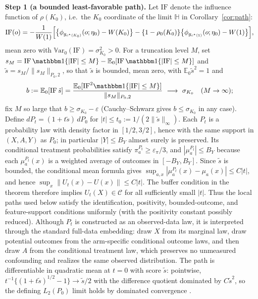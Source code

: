 \documentclass[11pt]{article}
\newcommand{\E}{\mathbb E}
\newcommand{\ind}[1]{\mathbbm 1\{#1\}}
\newcommand{\Var}{\mathbb V\mathrm{ar}}
\newcommand{\calC}{\mathcal C}
\newcommand{\eps}{\varepsilon}
\newcommand{\norm}[1]{\lVert #1\rVert}
\begin{document}
\textbf{Step 1 (a bounded least-favorable path).}
Let $\mathrm{IF}$ denote the influence function of $\rho(K_0)$, i.e.\ the $K_0$ coordinate of the limit $\mathbb H$ in Corollary~\ref{cor:path}:
\begin{equation*}
\mathrm{IF}(o)
=-\frac1{W(1)}\Bigl[\bigl\{\phi_{g_{c^\star(K_0)}}(o;\eta_0)-W(K_0)\bigr\}
-\{1-\rho_0(K_0)\}\bigl\{\phi_{g_{c^\star(1)}}(o;\eta_0)-W(1)\bigr\}\Bigr],
\end{equation*}
mean zero with $\Var_0(\mathrm{IF})=\sigma_{K_0}^2>0$.  For a truncation level $M$, set $s_M=\mathrm{IF}\,\ind{|\mathrm{IF}|\le M}-\E_0[\mathrm{IF}\,\ind{|\mathrm{IF}|\le M}]$ and $\tilde s=s_M/\norm{s_M}_{P_0,2}$, so that $\tilde s$ is bounded, mean zero, with $\E_0\tilde s^2=1$ and
\begin{equation*}
b:=\E_0[\mathrm{IF}\,\tilde s]
=\frac{\E_0[\mathrm{IF}^2\ind{|\mathrm{IF}|\le M}]}{\norm{s_M}_{P_0,2}}
\ \longrightarrow\ \sigma_{K_0}
\quad(M\to\infty);
\end{equation*}
fix $M$ so large that $b\ge\sigma_{K_0}-\eps$ (Cauchy--Schwarz gives $b\le\sigma_{K_0}$ in any case).  Define $dP_t=(1+t\tilde s)\,dP_0$ for $|t|\le t_0:=1/(2\norm{\tilde s}_\infty)$.  Each $P_t$ is a probability law with density factor in $[1/2,3/2]$, hence with the same support in $(X,A,Y)$ as $P_0$; in particular $|Y|\le B_Y$ almost surely is preserved.  Its conditional treatment probabilities satisfy $\pi^{P_t}_a\ge\eps_\pi/3$, and $|\mu^{P_t}_a|\le B_Y$ because each $\mu^{P_t}_a(x)$ is a weighted average of outcomes in $[-B_Y,B_Y]$.  Since $\tilde s$ is bounded, the conditional mean formula gives $\sup_{a,x}|\mu^{P_t}_a(x)-\mu_a(x)|\le C|t|$, and hence $\sup_x\norm{U_t(x)-U(x)}\le C|t|$.  The buffer condition in the theorem therefore implies $U_t(X)\in\calC$ for all sufficiently small $|t|$.  Thus the local paths used below satisfy the identification, positivity, bounded-outcome, and feature-support conditions uniformly (with the positivity constant possibly reduced).  Although $P_t$ is constructed as an observed-data law, it is interpreted through the standard full-data embedding: draw $X$ from its marginal law, draw potential outcomes from the arm-specific conditional outcome laws, and then draw $A$ from the conditional treatment law, which preserves no unmeasured confounding and realizes the same observed distribution.  The path is differentiable in quadratic mean at $t=0$ with score $\tilde s$: pointwise, $t^{-1}\{(1+t\tilde s)^{1/2}-1\}\to\tilde s/2$ with the difference quotient dominated by $C\tilde s^2$, so the defining $L_2(P_0)$ limit holds by dominated convergence \citep[Section~7.2]{vandervaart1998}.
\end{document}
